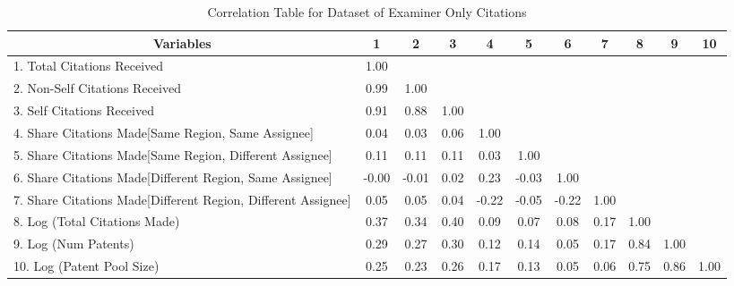\documentclass[12pt,letterpaper]{article}
\begin{document}
\begin{center}
\begin{table}[htbp]\centering \caption{Correlation Table for Dataset of Examiner Only Citations \label{e.corrtable}}
\scriptsize
\singlespacing
\begin{adjustbox}{angle=0}
\begin{tabular}{l  c  c  c  c  c  c  c  c  c  c }

\hline
\multicolumn{1}{c}{Variables} &1&2&3&4&5&6&7&8&9&10\\ \hline
1. Total Citations Received&1.00\\
2. Non-Self Citations Received&0.99&1.00\\
3. Self Citations Received&0.91&0.88&1.00\\
4. Share Citations Made[Same Region, Same Assignee]&0.04&0.03&0.06&1.00\\
5. Share Citations Made[Same Region, Different Assignee]&0.11&0.11&0.11&0.03&1.00\\
6. Share Citations Made[Different Region, Same Assignee]&-0.00&-0.01&0.02&0.23&-0.03&1.00\\
7. Share Citations Made[Different Region, Different Assignee]&0.05&0.05&0.04&-0.22&-0.05&-0.22&1.00\\
8. Log (Total Citations Made)&0.37&0.34&0.40&0.09&0.07&0.08&0.17&1.00\\
9. Log (Num Patents)&0.29&0.27&0.30&0.12&0.14&0.05&0.17&0.84&1.00\\
10. Log (Patent Pool Size)&0.25&0.23&0.26&0.17&0.13&0.05&0.06&0.75&0.86&1.00\\ \hline
\end{tabular}
\end{adjustbox}
\end{table}
\end{center}
\end{document}
